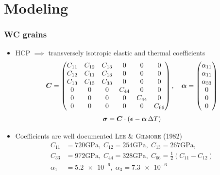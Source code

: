 \documentclass[11pt]{beamer} %
\begin{document}
\section{Modeling}
\begin{frame}
 \frametitle{WC grains}
  \begin{itemize}
  \item HCP $\implies$ transversely isotropic elastic and thermal coefficients
  \begin{align*}
   \boldsymbol{C} = \begin{pmatrix} C_{11} & C_{12} & C_{13} & 0 & 0 & 0 \\
                                C_{12} & C_{11} & C_{13} & 0 & 0 & 0 \\
                                C_{13} & C_{13} & C_{33} & 0 & 0 & 0 \\
                                0 & 0 & 0 & C_{44} & 0 & 0 \\
                                0 & 0 & 0 & 0 & C_{44} & 0 \\
                                0 & 0 & 0 & 0 & 0 & C_{66} \\
                \end{pmatrix}, \quad
    \boldsymbol{\alpha} = \begin{pmatrix} \alpha_{11} \\ \alpha_{11} \\ \alpha_{33} \\ 0 \\ 0 \\ 0 \end{pmatrix}
  \end{align*}
  \begin{align*}
    \boldsymbol{\sigma} = \boldsymbol{C} \cdot (\boldsymbol{\epsilon} - \boldsymbol{\alpha} \, \Delta T)
  \end{align*}
  \item Coefficients are well documented \textsc{Lee \& Gilmore (1982)}
  \begin{align*}
     C_{11} &= 720\si{\giga\pascal},\; C_{12} = 254\si{\giga\pascal},\; C_{13} = 267\si{\giga\pascal}, \\
     C_{33} &= 972\si{\giga\pascal},\; C_{44} = 328\si{\giga\pascal},\; C_{66} = \frac12 (C_{11}-C_{12})
     \\
     \alpha_1 &= \num{5.2e-6},\; \alpha_3 = \num{7.3e-6}
  \end{align*}
  \end{itemize}
\end{frame}
\end{document}

